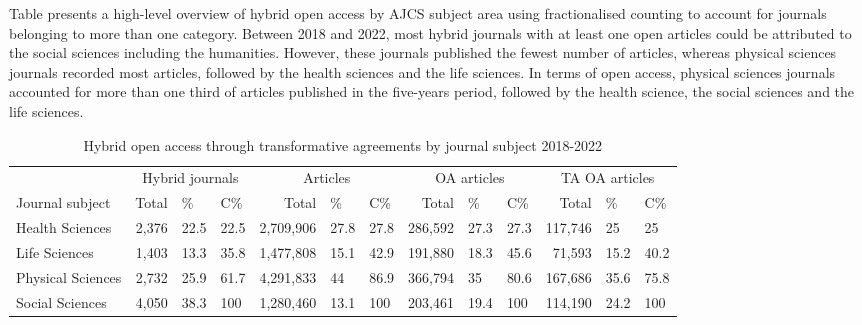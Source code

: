 \documentclass[a4paper,man,floatsintext,longtable,noextraspace,12pt]{apa6}
\begin{document}
Table presents a high-level overview of hybrid open access by AJCS
subject area using fractionalised counting to account for journals
belonging to more than one category. Between 2018 and 2022, most hybrid
journals with at least one open articles could be attributed to the
social sciences including the humanities. However, these journals
published the fewest number of articles, whereas physical sciences
journals recorded most articles, followed by the health sciences and the
life sciences. In terms of open access, physical sciences journals
accounted for more than one third of articles published in the
five-years period, followed by the health science, the social sciences
and the life sciences.

\begin{table}[H]

\caption{\label{tab:subject_summary_table}Hybrid open access through transformative agreements by journal subject 2018-2022}
\centering
\begin{tabular}[t]{lrllrllrllrll}
\toprule
\multicolumn{1}{c}{ } & \multicolumn{3}{c}{Hybrid journals} & \multicolumn{3}{c}{Articles} & \multicolumn{3}{c}{OA articles} & \multicolumn{3}{c}{TA OA articles} \\
\cmidrule(l{3pt}r{3pt}){2-4} \cmidrule(l{3pt}r{3pt}){5-7} \cmidrule(l{3pt}r{3pt}){8-10} \cmidrule(l{3pt}r{3pt}){11-13}
Journal subject & Total & \% & C\% & Total & \% & C\% & Total & \% & C\% & Total & \% & C\%\\
\midrule
Health Sciences & 2,376 & 22.5 & 22.5 & 2,709,906 & 27.8 & 27.8 & 286,592 & 27.3 & 27.3 & 117,746 & 25 & 25\\
Life Sciences & 1,403 & 13.3 & 35.8 & 1,477,808 & 15.1 & 42.9 & 191,880 & 18.3 & 45.6 & 71,593 & 15.2 & 40.2\\
Physical Sciences & 2,732 & 25.9 & 61.7 & 4,291,833 & 44 & 86.9 & 366,794 & 35 & 80.6 & 167,686 & 35.6 & 75.8\\
Social Sciences & 4,050 & 38.3 & 100 & 1,280,460 & 13.1 & 100 & 203,461 & 19.4 & 100 & 114,190 & 24.2 & 100\\
\bottomrule
\end{tabular}
\end{table}
\end{document}
